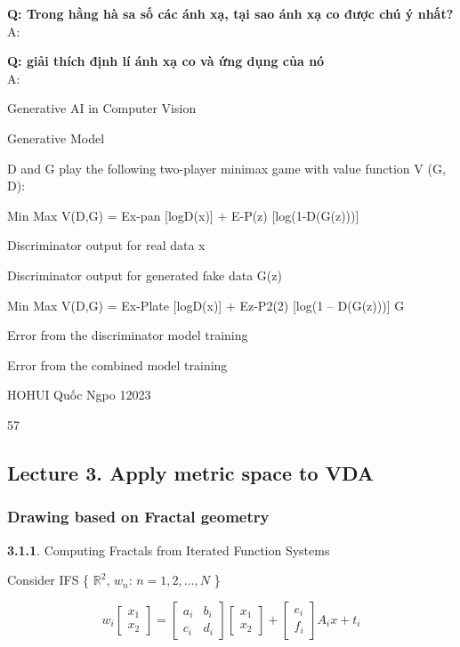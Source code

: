 \textbf{Q: Trong hằng hà sa số các ánh xạ, tại sao ánh xạ co được chú ý nhất?}\\
A: 

\textbf{Q: giải thích định lí ánh xạ co và ứng dụng của nó}\\
A: 














Generative AI in Computer Vision

Generative Model

D and G play the following two-player minimax game with value function V (G, D):

Min Max V(D,G) = Ex-pan [logD(x)] + E-P(z) [log(1-D(G(z)))]

Discriminator output for real data x

Discriminator output for generated fake data G(z)

Min Max V(D,G) = Ex-Plate [logD(x)] + Ez-P2(2) [log(1 – D(G(z)))] G

Error from the discriminator model training

Error from the combined model training

HOHUI Quốc Ngpo 12023

57





\pagebreak
\subsection{Lecture 3. Apply metric space to VDA}
\subsubsection {Drawing based on Fractal geometry}
\textbf{3.1.1}. Computing Fractals from Iterated Function Systems

Consider IFS \{ $\mathbb{R}^2$, $w_n$: $n = 1, 2, \ldots, N$ \}

\begin{equation*}
    w_i 
    \begin{bmatrix}
    x_1\\
    x_2
    \end{bmatrix}
    = 
    \begin{bmatrix}
    a_i & b_i\\
    c_i & d_i
    \end{bmatrix}
    \begin{bmatrix}
    x_1\\
    x_2
    \end{bmatrix}
    +
    \begin{bmatrix}
    e_i\\
    f_i
    \end{bmatrix}
    A_i x + t_i
\end{equation*}

